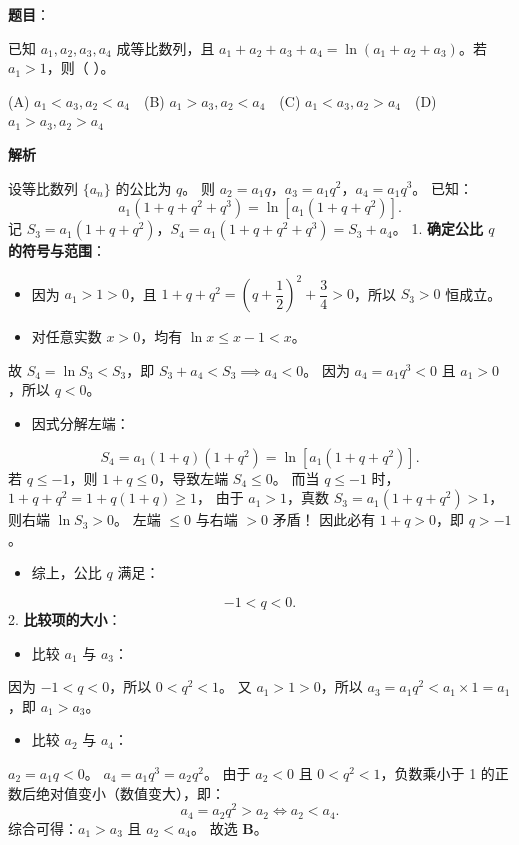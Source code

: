 \begin{answer}

\textbf{题目}：

已知 $a_1, a_2, a_3, a_4$ 成等比数列，且 $a_1 + a_2 + a_3 + a_4 = \ln(a_1 + a_2 + a_3)$。若 $a_1 > 1$，则（ ）。

(A) $a_1 < a_3, a_2 < a_4$　(B) $a_1 > a_3, a_2 < a_4$　(C) $a_1 < a_3, a_2 > a_4$　(D) $a_1 > a_3, a_2 > a_4$

\textbf{解析}

设等比数列 $\{a_n\}$ 的公比为 $q$。
则 $a_2 = a_1 q$，$a_3 = a_1 q^2$，$a_4 = a_1 q^3$。
已知：
\nopagebreak[4]
\[a_1(1 + q + q^2 + q^3) = \ln[a_1(1 + q + q^2)].\]
记 $S_3 = a_1(1 + q + q^2)$，$S_4 = a_1(1 + q + q^2 + q^3) = S_3 + a_4$。
1. \textbf{确定公比 $q$ 的符号与范围}：
\begin{itemize}
\item 因为 $a_1 > 1 > 0$，且 $1 + q + q^2 = \left(q + \dfrac12\right)^2 + \dfrac34 > 0$，所以 $S_3 > 0$ 恒成立。
\item 对任意实数 $x > 0$，均有 $\ln x \leqslant x - 1 < x$。
\end{itemize}
     故 $S_4 = \ln S_3 < S_3$，即 $S_3 + a_4 < S_3 \implies a_4 < 0$。
     因为 $a_4 = a_1 q^3 < 0$ 且 $a_1 > 0$，所以 $q < 0$。
\begin{itemize}
\item 因式分解左端：
\end{itemize}
\nopagebreak[4]
\[S_4 = a_1(1 + q)(1 + q^2) = \ln[a_1(1 + q + q^2)].\]
     若 $q \leqslant -1$，则 $1 + q \leqslant 0$，导致左端 $S_4 \leqslant 0$。
     而当 $q \leqslant -1$ 时，$1 + q + q^2 = 1 + q(1 + q) \geqslant 1$，
     由于 $a_1 > 1$，真数 $S_3 = a_1(1 + q + q^2) > 1$，则右端 $\ln S_3 > 0$。
     左端 $\leqslant 0$ 与右端 $> 0$ 矛盾！
     因此必有 $1 + q > 0$，即 $q > -1$。
\begin{itemize}
\item 综上，公比 $q$ 满足：
\end{itemize}
\nopagebreak[4]
\[-1 < q < 0.\]
2. \textbf{比较项的大小}：
\begin{itemize}
\item 比较 $a_1$ 与 $a_3$：
\end{itemize}
     因为 $-1 < q < 0$，所以 $0 < q^2 < 1$。
     又 $a_1 > 1 > 0$，所以 $a_3 = a_1 q^2 < a_1 \times 1 = a_1$，即 $a_1 > a_3$。
\begin{itemize}
\item 比较 $a_2$ 与 $a_4$：
\end{itemize}
     $a_2 = a_1 q < 0$。
     $a_4 = a_1 q^3 = a_2 q^2$。
     由于 $a_2 < 0$ 且 $0 < q^2 < 1$，负数乘小于 1 的正数后绝对值变小（数值变大），即：
\nopagebreak[4]
\[a_4 = a_2 q^2 > a_2 \iff a_2 < a_4.\]
综合可得：$a_1 > a_3$ 且 $a_2 < a_4$。
故选 \textbf{B}。


\par\medskip

\end{answer}

